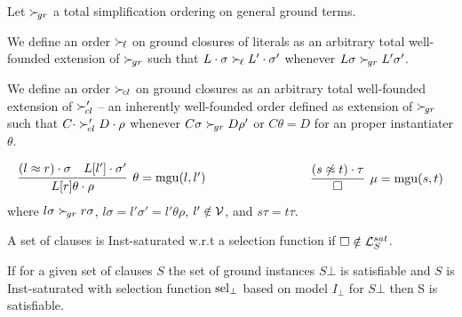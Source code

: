 \begin{definition}
    Let $\mathrel\succ_{\!gr}$ a total simplification ordering on general ground terms.

    We define an order $\mathrel\succ_{\!\ell}$ on ground closures of literals
    as an arbitrary total well-founded extension of $\mathrel\succ_{\!gr}$
    such that
    $L\cdot\sigma\mathrel\succ_{\!\ell} L'\cdot\sigma'$ whenever
    $L\sigma\mathrel\succ_{\!gr} L'\sigma'$.

    We define an order $\mathrel\succ_{\!cl}$ on ground closures
    as an arbitrary total well-founded extension of
    $\mathrel\succ_{\!cl}'$ -- an inherently well-founded order defined as extension of $\mathrel\succ_{\!gr}$
    such that
    $C\cdot\mathrel\succ_{\!cl}' D\cdot\rho$ whenever
    $C\sigma\mathrel\succ_{\!gr} D\rho'$ or $C\theta = D$ for an proper instantiater $\theta$.
\end{definition}



\begin{gather*}
        \infer[\theta=\mgu(l,l')]
        {L[r]\theta\cdot\rho}
        {(l\mEQ r)\cdot\sigma & L[l']\cdot\sigma'}
        \hspace{3cm}
        \infer[\mu=\mgu(s,t)]
        {\emptyclause}
        {(s\mNE t)\cdot\tau}
\end{gather*}
where
    $l\sigma\mathrel\succ_{\!gr} r\sigma$,
    $l\sigma = l'\sigma' = l'\theta\rho$,
    $l'\notin{\mathcal V}$,
    and
    $s\tau = t\tau$.



\begin{definition}
    A set of clauses is Inst-saturated w.r.t a selection function if
    $\square\notin{\mathcal L}_S^{sat}$.
\end{definition}

\begin{theorem}
    If for a given set of clauses $S$
    the set of ground instances $S\bot$ is satisfiable
    and $S$ is Inst-saturated
    with selection function $\operatorname{sel}_\bot$ based
    on model $I_\bot$ for $S\bot$
    then S is satisfiable.
\end{theorem}

